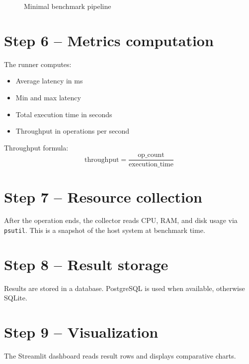 \documentclass[12pt]{report}
\begin{document}
\begin{figure}[H]
\centering
{}
\caption{Minimal benchmark pipeline}
\end{figure}

\section{Step 6 -- Metrics computation}
The runner computes:
\begin{itemize}
  \item Average latency in ms
  \item Min and max latency
  \item Total execution time in seconds
  \item Throughput in operations per second
\end{itemize}
Throughput formula:
\[ \text{throughput} = \frac{\text{op\_count}}{\text{execution\_time}} \]

\section{Step 7 -- Resource collection}
After the operation ends, the collector reads CPU, RAM, and disk usage via \texttt{psutil}. This is
a snapshot of the host system at benchmark time.

\section{Step 8 -- Result storage}
Results are stored in a database. PostgreSQL is used when available, otherwise SQLite.

\section{Step 9 -- Visualization}
The Streamlit dashboard reads result rows and displays comparative charts.
\end{document}
